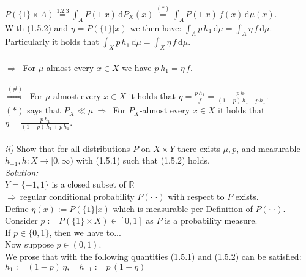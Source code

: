 \documentclass{article}
\begin{document}
\vspace*{-1em} \\
\indent $P(\{ 1\} \times A) \overset{1.2.3}{=} \displaystyle{ \int_{A} P({1}| x)\, \text{d}P_X(x) \overset{(*)}{=} \int_{A} P({1}| x)\, f(x)\, \text{d}\mu(x)  }  $.\\
With (1.5.2) and $\eta=P(\{ 1\}|x)$ we then have: $\displaystyle{ \int_{A} p\,h_1\, \text{d}\mu =\int_A \eta \, f \, \text{d}\mu  }$.\\
Particularly it holds that $\displaystyle{ \int_{X} p\,h_1\, \text{d}\mu =\int_X \eta \, f \, \text{d}\mu  }$.\\
\vspace*{-1em} \\
$\Rightarrow \ $ For $\mu$-almost every $x\in X$ we have $\displaystyle{ p\ h_1 = \eta \, f } $. \\
\vspace*{-1em} \\
$\overset{(\#)}{\Rightarrow} \ $ For $\mu$-almost every $x\in X$ it holds that $\displaystyle{ \eta = \frac{p\, h_1}{f} = \frac{p \, h_1}{(1-p)\,h_1 + p\, h_1} }$.\\
$(*)$ says that $P_X \ll \mu \ \Rightarrow \ $ For $P_X$-almost every $x\in X$ it holds that $\displaystyle{ \eta = \frac{p \, h_1}{(1-p)\,h_1 + p\, h_1} }$.\\
\\
\textsl{ii)} Show that for all distributions $P$ on $X\times Y$ there exists $\mu, p$, and measurable $h_{-1}, h: X \rightarrow [0,\infty)$ with (1.5.1) such that (1.5.2) holds. \vspace{0.5em}\\
\textsl{Solution:} \\
$Y=\{-1,1\}$ is a closed subset of $\mathbb{R} \ $\\
$\Rightarrow \ $regular conditional probability $P(\cdot | \cdot )$ with respect to $P$ exists.  \\
Define $\eta(x):=P(\{1\}|x)$ which is measurable per Definition of $P(\cdot | \cdot )$. \\
Consider $p:=P(\{1\} \times X) \in [0,1]$ as $P$ is a probability measure. \\
If $p \in \{0,1\}$, then we have to... \\
Now suppose $p \in (0,1)$. \\
We prose that with the following quantities  (1.5.1) and (1.5.2) can be satisfied: \\
\indent $h_1 := (1-p)\, \eta, \quad h_{-1}:= p\, (1-\eta) \quad $\\
\end{document}
